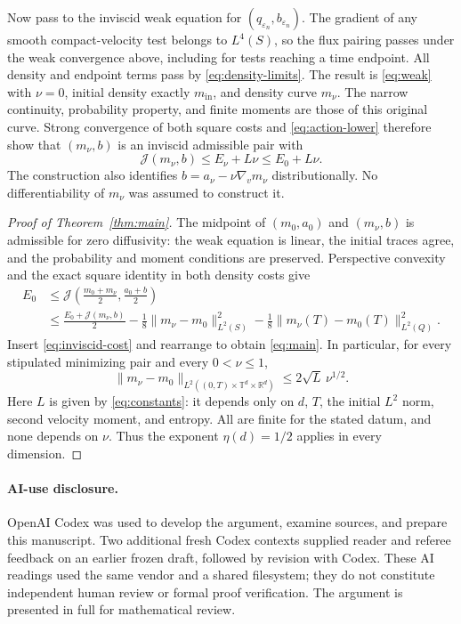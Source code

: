 \documentclass[11pt]{article}
\newcommand{\T}{\mathbb T}
\newcommand{\R}{\mathbb R}
\newcommand{\mi}{m_{\mathrm{in}}}
\newcommand{\J}{\mathcal J}
\begin{document}
Now pass to the inviscid weak equation for $(q_{\varepsilon_n},
b_{\varepsilon_n})$. The gradient of any smooth compact-velocity test
belongs to $L^4(S)$, so the flux pairing passes under the weak convergence
above, including for tests reaching a time endpoint.
All density and endpoint terms pass by \eqref{eq:density-limits}.
The result is \eqref{eq:weak} with $\nu=0$, initial density exactly $\mi$,
and density curve $m_\nu$. The narrow continuity, probability property,
and finite moments are those of this original curve.
Strong convergence of both square costs and \eqref{eq:action-lower}
therefore show that $(m_\nu,b)$ is an inviscid admissible pair with
\begin{equation}\label{eq:inviscid-cost}
 \J(m_\nu,b)\leq E_\nu+L\nu\leq E_0+L\nu .
\end{equation}
The construction also identifies
$b=a_\nu-\nu\nabla_vm_\nu$ distributionally. No differentiability of
$m_\nu$ was assumed to construct it.

\begin{proof}[Proof of Theorem~\ref{thm:main}]
The midpoint of $(m_0,a_0)$ and $(m_\nu,b)$ is admissible for zero
diffusivity: the weak equation is linear, the initial traces agree, and
the probability and moment conditions are preserved.
Perspective convexity and the exact square identity in both density costs
give
\[
 \begin{split}
 E_0
 &\leq \J\left(\frac{m_0+m_\nu}{2},\frac{a_0+b}{2}\right)\\
 &\leq\frac{E_0+\J(m_\nu,b)}{2}
 -\frac18\|m_\nu-m_0\|_{L^2(S)}^2
 -\frac18\|m_\nu(T)-m_0(T)\|_{L^2(Q)}^2 .
 \end{split}
\]
Insert \eqref{eq:inviscid-cost} and rearrange to obtain
\eqref{eq:main}. In particular, for every stipulated minimizing pair
and every $0<\nu\leq1$,
\[
 \|m_\nu-m_0\|_{L^2((0,T)\times\T^d\times\R^d)}
 \leq2\sqrt L\,\nu^{1/2}.
\]
Here $L$ is given by \eqref{eq:constants}: it depends only on $d$, $T$,
the initial $L^2$ norm, second velocity moment, and entropy.
All are finite for the stated datum, and none depends on $\nu$.
Thus the exponent $\eta(d)=1/2$ applies in every dimension.
\end{proof}

\paragraph{AI-use disclosure.}
OpenAI Codex was used to develop the argument, examine sources, and prepare
this manuscript. Two additional fresh Codex contexts supplied reader and
referee feedback on an earlier frozen draft, followed by revision with Codex.
These AI readings used the same vendor and a shared filesystem; they do not
constitute independent human review or formal proof verification.
The argument is presented in full for mathematical review.
\end{document}
